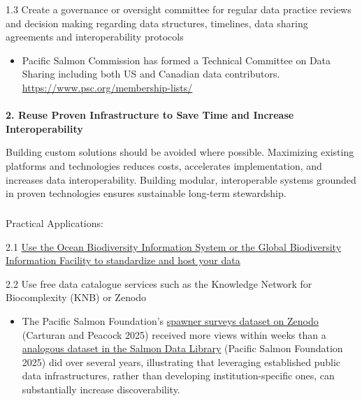 \documentclass[
  letterpaper,
  DIV=11,
  numbers=noendperiod]{scrartcl}
\makeatletter
\let\oldparagraph\paragraph
\renewcommand{\paragraph}{
    \@ifstar
      \xxxParagraphStar
      \xxxParagraphNoStar
  }
\newcommand{\xxxParagraphStar}[1]{\oldparagraph*{#1}\mbox{}}
\newcommand{\xxxParagraphNoStar}[1]{\oldparagraph{#1}\mbox{}}
\let\oldsubparagraph\subparagraph
\renewcommand{\subparagraph}{
    \@ifstar
      \xxxSubParagraphStar
      \xxxSubParagraphNoStar
  }
\newcommand{\xxxSubParagraphStar}[1]{\oldsubparagraph*{#1}\mbox{}}
\newcommand{\xxxSubParagraphNoStar}[1]{\oldsubparagraph{#1}\mbox{}}
\providecommand{\tightlist}{%
  \setlength{\itemsep}{0pt}\setlength{\parskip}{0pt}}
\makeatother
\begin{document}
1.3 Create a governance or oversight committee for regular data practice
reviews and decision making regarding data structures, timelines, data
sharing agreements and interoperability protocols

\begin{itemize}
\tightlist
\item
  Pacific Salmon Commission has formed a Technical Committee on Data
  Sharing including both US and Canadian data contributors.
  \url{https://www.psc.org/membership-lists/}
\end{itemize}

\paragraph{\texorpdfstring{\textbf{2. Reuse Proven Infrastructure to
Save Time and Increase
Interoperability}}{2. Reuse Proven Infrastructure to Save Time and Increase Interoperability}}\label{reuse-proven-infrastructure-to-save-time-and-increase-interoperability}

Building custom solutions should be avoided where possible. Maximizing
existing platforms and technologies reduces costs, accelerates
implementation, and increases data interoperability. Building modular,
interoperable systems grounded in proven technologies ensures
sustainable long-term stewardship.

\subparagraph{Practical Applications:}\label{practical-applications-1}

2.1 \href{https://doi.org/10.14286/duc6mu}{Use the Ocean Biodiversity
Information System or the Global Biodiversity Information Facility to
standardize and host your data}

2.2 Use free data catalogue services such as the Knowledge Network for
Biocomplexity (KNB) or Zenodo

\begin{itemize}
\tightlist
\item
  The Pacific Salmon Foundation's
  \href{https://doi.org/10.5281/zenodo.14194638}{spawner surveys dataset
  on Zenodo} (Carturan and Peacock 2025) received more views within
  weeks than a
  \href{https://data.salmonwatersheds.ca/result?datasetid=2}{analogous
  dataset in the Salmon Data Library} (Pacific Salmon Foundation 2025)
  did over several years, illustrating that leveraging established
  public data infrastructures, rather than developing
  institution-specific ones, can substantially increase discoverability.
\end{itemize}
\end{document}
